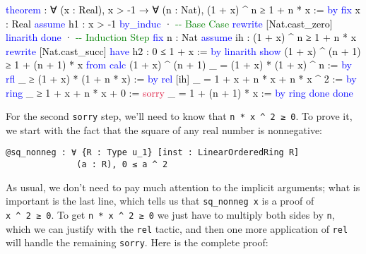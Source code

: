 \documentclass[
  letterpaper,
  DIV=11,
  numbers=noendperiod]{scrreprt}
\makeatletter
\newenvironment{Shaded}{\begin{snugshade}}{\end{snugshade}}
\newcommand{\AnnotationTok}[1]{\textcolor[rgb]{0.37,0.37,0.37}{#1}}
\newcommand{\CommentTok}[1]{\textcolor[rgb]{0.37,0.37,0.37}{#1}}
\newcommand{\ConstantTok}[1]{\textcolor[rgb]{0.56,0.35,0.01}{#1}}
\newcommand{\KeywordTok}[1]{\textcolor[rgb]{0.00,0.23,0.31}{#1}}
\newcommand{\NormalTok}[1]{\textcolor[rgb]{0.00,0.23,0.31}{#1}}
\newcommand{\SpecialCharTok}[1]{\textcolor[rgb]{0.37,0.37,0.37}{#1}}
\def\brownsquiggly{\bgroup \markoverwith{\textcolor[HTML]{B8860B}{\lower3.5\p@\hbox{\sixly \char58}}}\ULon}
\renewcommand{\NormalTok}[1]{\textcolor[HTML]{000000}{#1}}
\renewcommand{\KeywordTok}[1]{\textcolor[HTML]{0000FF}{#1}}
\renewcommand{\SpecialCharTok}[1]{}
\renewcommand{\CommentTok}[1]{\textcolor[HTML]{008000}{#1}}
\renewcommand{\ConstantTok}[1]{\textcolor[HTML]{DC143C}{#1}}
\renewcommand{\AnnotationTok}[1]{\brownsquiggly{#1}}
\newenvironment{ind}
	{\begin{list}{}{\setlength{\leftmargin}{1em}}\item\relax}
	{\end{list}}
\theoremstyle{remark}
\makeatother
\begin{document}
\begin{Shaded}
\begin{Highlighting}[]
\KeywordTok{theorem} \SpecialCharTok{??}\AnnotationTok{Example\_6\_3\_4}\SpecialCharTok{::}\NormalTok{ : ∀ (x : Real), x \textgreater{} {-}1 →}
\NormalTok{    ∀ (n : Nat), (1 + x) \^{} n ≥ 1 + n * x := }\KeywordTok{by}
  \KeywordTok{fix}\NormalTok{ x : Real}
  \KeywordTok{assume}\NormalTok{ h1 : x \textgreater{} {-}1}
  \KeywordTok{by\_induc}
\NormalTok{  · }\CommentTok{{-}{-} Base Case}
    \KeywordTok{rewrite}\NormalTok{ [Nat.cast\_zero]}
    \KeywordTok{linarith}
    \KeywordTok{done}
\NormalTok{  · }\CommentTok{{-}{-} Induction Step}
    \KeywordTok{fix}\NormalTok{ n : Nat}
    \KeywordTok{assume}\NormalTok{ ih : (1 + x) \^{} n ≥ 1 + n * x}
    \KeywordTok{rewrite}\NormalTok{ [Nat.cast\_succ]}
    \KeywordTok{have}\NormalTok{ h2 : 0 ≤ 1 + x := }\KeywordTok{by} \KeywordTok{linarith}
    \KeywordTok{show}\NormalTok{ (1 + x) \^{} (n + 1) ≥ 1 + (n + 1) * x }\KeywordTok{from}
      \KeywordTok{calc}\NormalTok{ (1 + x) \^{} (n + 1)}
\NormalTok{        \_ = (1 + x) * (1 + x) \^{} n := }\KeywordTok{by} \KeywordTok{rfl}
\NormalTok{        \_ ≥ (1 + x) * (1 + n * x) := }\KeywordTok{by} \KeywordTok{rel}\NormalTok{ [ih]}
\NormalTok{        \_ = 1 + x + n * x + n * x \^{} 2 := }\KeywordTok{by} \KeywordTok{ring}
\NormalTok{        \_ ≥ 1 + x + n * x + 0 := }\ConstantTok{sorry}
\NormalTok{        \_ = 1 + (n + 1) * x := }\KeywordTok{by} \KeywordTok{ring}
    \KeywordTok{done}
  \KeywordTok{done}
\end{Highlighting}
\end{Shaded}

For the second \texttt{sorry} step, we'll need to know that
\texttt{n\ *\ x\ \^{}\ 2\ ≥\ 0}. To prove it, we start with the fact
that the square of any real number is nonnegative:

\begin{ind}

\begin{verbatim}
@sq_nonneg : ∀ {R : Type u_1} [inst : LinearOrderedRing R]
              (a : R), 0 ≤ a ^ 2
\end{verbatim}

\end{ind}

As usual, we don't need to pay much attention to the implicit arguments;
what is important is the last line, which tells us that
\texttt{sq\_nonneg\ x} is a proof of \texttt{x\ \^{}\ 2\ ≥\ 0}. To get
\texttt{n\ *\ x\ \^{}\ 2\ ≥\ 0} we just have to multiply both sides by
\texttt{n}, which we can justify with the \texttt{rel} tactic, and then
one more application of \texttt{rel} will handle the remaining
\texttt{sorry}. Here is the complete proof:
\end{document}
